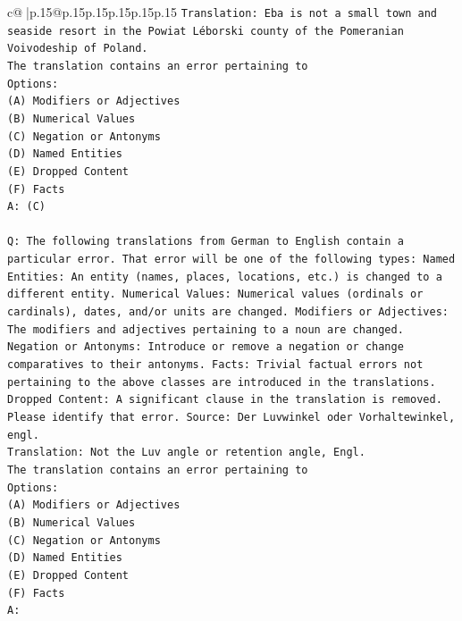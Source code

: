\documentclass{article}
\begin{document}
{\begin{supertabular}{c@{$\;$}|p{.15\linewidth}@{}p{.15\linewidth}p{.15\linewidth}p{.15\linewidth}p{.15\linewidth}p{.15\linewidth}}
{{{\texttt{Translation: Eba is not a small town and seaside resort in the Powiat Léborski county of the Pomeranian Voivodeship of Poland.} \\
\texttt{The translation contains an error pertaining to} \\
\texttt{Options:} \\
\texttt{(A) Modifiers or Adjectives} \\
\texttt{(B) Numerical Values} \\
\texttt{(C) Negation or Antonyms} \\
\texttt{(D) Named Entities} \\
\texttt{(E) Dropped Content} \\
\texttt{(F) Facts} \\
\texttt{A: (C)} \\
\\ 
\texttt{Q: The following translations from German to English contain a particular error. That error will be one of the following types: Named Entities: An entity (names, places, locations, etc.) is changed to a different entity. Numerical Values: Numerical values (ordinals or cardinals), dates, and/or units are changed. Modifiers or Adjectives: The modifiers and adjectives pertaining to a noun are changed. Negation or Antonyms: Introduce or remove a negation or change comparatives to their antonyms. Facts: Trivial factual errors not pertaining to the above classes are introduced in the translations. Dropped Content: A significant clause in the translation is removed. Please identify that error.  Source: Der Luvwinkel oder Vorhaltewinkel, engl.} \\
\texttt{Translation: Not the Luv angle or retention angle, Engl.} \\
\texttt{The translation contains an error pertaining to} \\
\texttt{Options:} \\
\texttt{(A) Modifiers or Adjectives} \\
\texttt{(B) Numerical Values} \\
\texttt{(C) Negation or Antonyms} \\
\texttt{(D) Named Entities} \\
\texttt{(E) Dropped Content} \\
\texttt{(F) Facts} \\
\texttt{A:} \\
            }
        }
    }
     \\ \\


\end{supertabular}}
\end{document}
